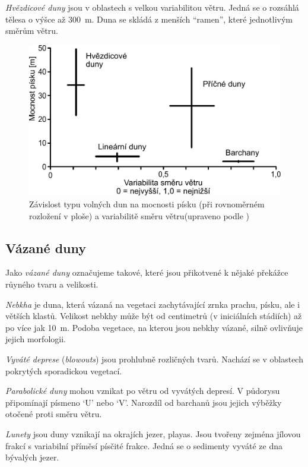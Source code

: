 \emph{Hvězdicové duny} jsou v oblastech s velkou variabilitou větru. Jedná se o rozsáhlá tělesa o výšce až \SI{300}{\metre}. Duna se skládá z menších \enquote{ramen}, které jednotlivým směrům větru.

\begin{figure}
	\centering
	\includegraphics[width=1\linewidth]{obrazky/eolicka/volne_duny}
	\caption{Závislost typu volných dun na mocnosti písku (při rovnoměrném rozložení v ploše) a variabilitě směru větru(upraveno podle \textcite{wassonFactorsDeterminingDesert1983})}
	\label{fig:volneduny}
\end{figure}

\subsection{Vázané duny}
Jako \emph{vázané duny} označujeme takové, které jsou přikotvené k nějaké překážce růyného tvaru a velikosti.

\emph{Nebkha} je duna, která vázaná na vegetaci zachytávající zrnka prachu, písku, ale i větších klastů. Velikost nebkhy může být od centimetrů (v iniciálních stádiích) až po více jak \SI{10}{\metre}. Podoba vegetace, na kterou jsou nebkhy vázané, silně ovlivňuje jejich morfologii.

\emph{Vyváté deprese} (\textit{blowouts}) jsou prohlubně rozličných tvarů. Nachází se v oblastech pokrytých sporadickou vegetací.

\emph{Parabolické duny} mohou vznikat po větru od vyvátých depresí. V půdorysu připomínají písmeno \enquote*{U} nebo \enquote*{V}. Narozdíl od barchanů jsou jejich výběžky otočené proti směru větru.

\emph{Lunety} jsou duny vznikají na okrajích jezer, playas. Jsou tvořeny zejména jílovou frakcí s variabilní příměsí písčité frakce. Jedná se o sedimenty vyváté ze dna bývalých jezer.

